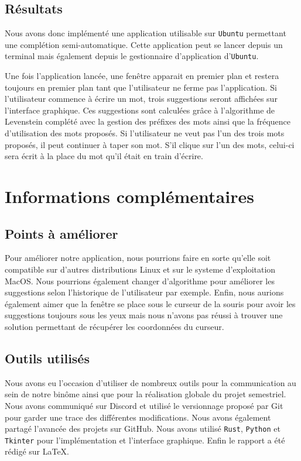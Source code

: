 \documentclass[a4paper, 11pt]{report}
\newcommand{\langage}[1]{\texttt{#1}}
\begin{document}
{\section{Résultats}
Nous avons donc implémenté une application utilisable sur \langage{Ubuntu} permettant une complétion semi-automatique. Cette application peut se lancer depuis un terminal mais également depuis le gestionnaire d'application d'\langage{Ubuntu}. \par
Une fois l'application lancée, une fenêtre apparait en premier plan et restera toujours en premier plan tant que l'utilisateur ne ferme pas l'application. Si l'utilisateur commence à écrire un mot, trois suggestions seront affichées sur l'interface graphique. Ces suggestions sont calculées grâce à l'algorithme de Levenstein complété avec la gestion des préfixes des mots ainsi que la fréquence d'utilisation des mots proposés. Si l'utilisateur ne veut pas l'un des trois mots proposés, il peut continuer à taper son mot. S'il clique sur l'un des mots, celui-ci sera écrit à la place du mot qu'il était en train d'écrire.


\chapter{Informations complémentaires}

\section{Points à améliorer}

Pour améliorer notre application, nous pourrions faire en sorte qu'elle soit compatible sur d'autres distributions Linux et sur le systeme d'exploitation MacOS. Nous pourrions également changer d'algorithme pour améliorer les suggestions selon l'historique de l'utilisateur par exemple. Enfin, nous aurions également aimer que la fenêtre se place sous le curseur de la souris pour avoir les suggestions toujours sous les yeux mais nous n'avons pas réussi à trouver une solution permettant de récupérer les coordonnées du curseur.


\section{Outils utilisés}

Nous avons eu l'occasion d'utiliser de  nombreux outils pour la communication au sein de notre binôme ainsi que pour la réalisation globale du projet semestriel. Nous avons communiqué sur Discord et utilisé le versionnage proposé par Git pour garder une trace des différentes modifications. Nous avons également partagé l'avancée des projets sur GitHub. Nous avons utilisé \langage{Rust}, \langage{Python} et \langage{Tkinter} pour l'implémentation et l'interface graphique. Enfin le rapport a été rédigé sur \LaTeX{}.

}
\end{document}
